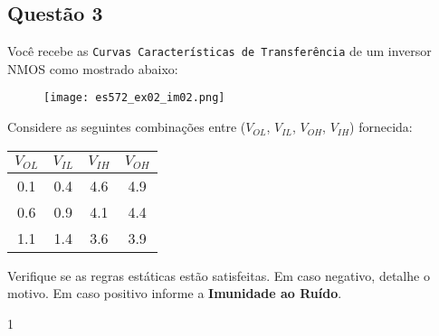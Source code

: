 \documentclass{article}
\begin{document}
\newpage
        \subsection{Questão 3}
            \begin{exercise}
                Você recebe as \texttt{Curvas Características de Transferência} de um inversor NMOS como mostrado abaixo:
                    \begin{figure}[H]
                        \centering
                        \texttt{[image: es572\_ex02\_im02.png]}
                    \end{figure} \noindent
                Considere as seguintes combinações entre ($V_{OL}$, $V_{IL}$, $V_{OH}$, $V_{IH}$) fornecida:
                    \begin{table}[H]
                        \centering  
                        \begin{tabular}[]{cccc}\hline
                            $V_{OL}$ & $V_{IL}$ & $V_{IH}$ & $V_{OH}$\\\hline
                            0.1      & 0.4      & 4.6      & 4.9\\
                            0.6      & 0.9      & 4.1      & 4.4\\
                            1.1      & 1.4      & 3.6      & 3.9\\\hline
                        \end{tabular}
                    \end{table}
                Verifique se as regras estáticas estão satisfeitas. Em caso negativo, detalhe o motivo. Em caso positivo informe a \textbf{Imunidade ao Ruído}.
            \end{exercise}

            \begin{resolution}
                1
            \end{resolution}

\newpage
\end{document}
